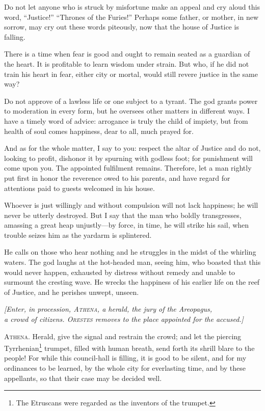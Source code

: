 \documentclass[12pt]{article}
\begin{document}
Do not let anyone who is struck by misfortune make an appeal and cry aloud this word, ``Justice!'' ``Thrones of the Furies!'' Perhaps some father, or mother, in new sorrow, may cry out these words piteously, now that the house of Justice is falling.

There is a time when fear is good and ought to remain seated as a guardian of the heart. It is profitable to learn wisdom under strain. But who, if he did not train his heart in fear, either city or mortal, would still revere justice in the same way?

Do not approve of a lawless life or one subject to a tyrant. The god grants power to moderation in every form, but he oversees other matters in different ways. I have a timely word of advice: arrogance is truly the child of impiety, but from health of soul comes happiness, dear to all, much prayed for.

And as for the whole matter, I say to you: respect the altar of Justice and do not, looking to profit, dishonor it by spurning with godless foot; for punishment will come upon you. The appointed fulfilment remains. Therefore, let a man rightly put first in honor the reverence owed to his parents, and have regard for attentions paid to guests welcomed in his house.

Whoever is just willingly and without compulsion will not lack happiness; he will never be utterly destroyed. But I say that the man who boldly transgresses, amassing a great heap unjustly---by force, in time, he will strike his sail, when trouble seizes him as the yardarm is splintered.

He calls on those who hear nothing and he struggles in the midst of the whirling waters. The god laughs at the hot-headed man, seeing him, who boasted that this would never happen, exhausted by distress without remedy and unable to surmount the cresting wave. He wrecks the happiness of his earlier life on the reef of Justice, and he perishes unwept, unseen.

\begin{center}
\textit{[Enter, in procession, \textsc{Athena,} a herald, the jury of the Areopagus,\\
a crowd of citizens. \textsc{Orestes} removes to the place appointed for the accused.]}
\end{center}

\textsc{Athena.} Herald, give the signal and restrain the crowd; and let the piercing Tyrrhenian\footnote{The Etruscans were regarded as the inventors of the trumpet.} trumpet, filled with human breath, send forth its shrill blare to the people! For while this council-hall is filling, it is good to be silent, and for my ordinances to be learned, by the whole city for everlasting time, and by these appellants, so that their case may be decided well.
\end{document}
